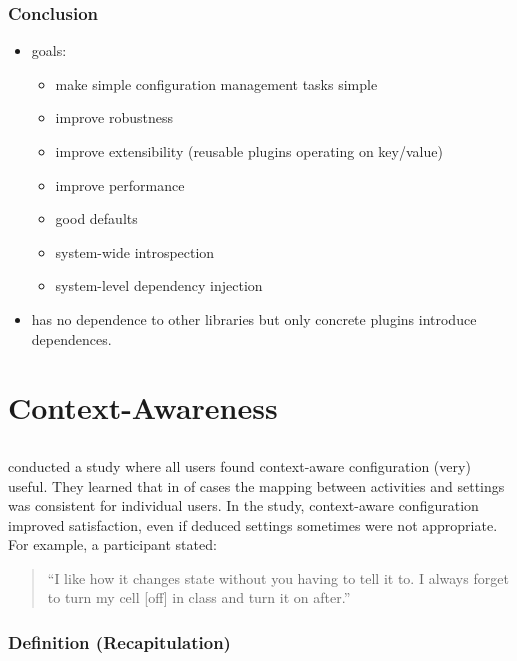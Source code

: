 \begin{frame}
	\frametitle{Conclusion}
	\begin{itemize}
	\item goals:
		\begin{itemize}
		\item make simple configuration management tasks simple
		\item improve robustness
		\item improve extensibility (reusable plugins operating on key/value)
		\item improve performance
		\item good defaults
		\item system-wide introspection
		\item system-level dependency injection
		\end{itemize}
	\item \elektra{} has no dependence to other libraries but only concrete plugins introduce dependences.
	\end{itemize}
\end{frame}




\section{Context-Awareness}

\subsection{}

\begin{frame}
	\citet{khalil2005context} conducted a study where all users found context-aware configuration (very) useful.
	They learned that in  of cases the mapping between activities and settings was consistent for individual users.
	In the study, context-aware configuration improved satisfaction, even if deduced settings sometimes were not appropriate.
	For example, a participant stated:
	\vspace{2em}

	\begin{quote}
	``I like how it changes state without you having to tell it to. I always forget to turn my cell [off] in class and turn it on after.''
	\end{quote}
\end{frame}

\begin{frame}
	\frametitle{Definition (Recapitulation)}
\end{frame}

